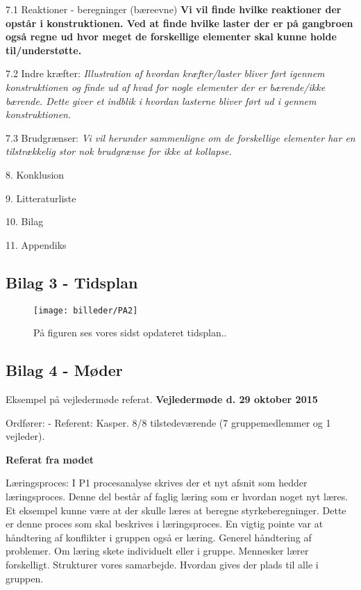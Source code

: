 7.1 Reaktioner - beregninger (bæreevne) \textbf{Vi vil finde hvilke reaktioner der opstår i konstruktionen. Ved at finde hvilke laster der er på gangbroen også regne ud hvor meget de forskellige elementer skal kunne holde til/understøtte.}

7.2 Indre kræfter: \textit{Illustration af hvordan kræfter/laster bliver ført igennem konstruktionen og finde ud af hvad for nogle elementer der er bærende/ikke bærende. Dette giver et indblik i hvordan lasterne bliver ført ud i gennem konstruktionen.}

7.3 Brudgrænser: \textit{Vi vil herunder sammenligne om de forskellige elementer har en tilstrækkelig stor nok brudgrænse for ikke at kollapse.}

8. Konklusion

9. Litteraturliste

10. Bilag

11. Appendiks




\subsection{Bilag 3 - Tidsplan} \label{sec:Bilag3}

\begin{figure}[H] 
\centering
\texttt{[image: billeder/PA2]}
\caption{På figuren ses vores sidst opdateret tidsplan..}
\label{fig:Sne1}
\end{figure}

\subsection{Bilag 4 - Møder} \label{sec:Bilag4}

Eksempel på vejledermøde referat.
\textbf{Vejledermøde d. 29 oktober 2015}

Ordfører: -
Referent: Kasper.
8/8 tilstedeværende (7 gruppemedlemmer og 1 vejleder).

\textbf{Referat fra mødet}

Læringsproces: I P1 procesanalyse skrives der et nyt afsnit som hedder læringsproces. Denne del består af faglig læring som er hvordan noget nyt læres. Et eksempel kunne være at der skulle læres at beregne styrkeberegninger. Dette er denne proces som skal beskrives i læringsproces. En vigtig pointe var at håndtering af konflikter i gruppen også er læring. Generel håndtering af problemer. Om læring skete individuelt eller i gruppe. Mennesker lærer forskelligt. Strukturer vores samarbejde. Hvordan gives der plads til alle i gruppen.

